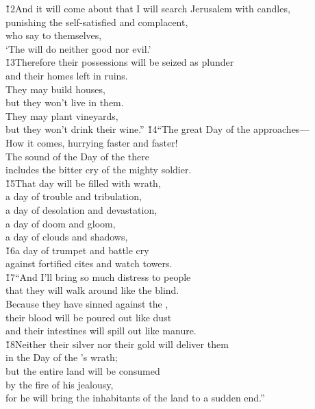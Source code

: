\begin{poetry}
\poeml \v{12}And it will come about that I will search Jerusalem with candles, \\
\poemll    punishing the self-satisfied and complacent, \\
\poeml who say to themselves, \\
\poemll    `The  will do neither good nor evil.' \\
\poeml \v{13}Therefore their possessions will be seized as plunder \\
\poemll    and their homes left in ruins. \\
\poeml They may build houses, \\
\poemll    but they won't live in them. \\
\poeml They may plant vineyards, \\
\poemll    but they won't drink their wine.''
\poeml \v{14}``The great Day of the  approaches--- \\
\poemll    How it comes, hurrying faster and faster! \\
\poeml The sound of the Day of the  there \\
\poemll    includes the bitter cry of the mighty soldier. \\
\poeml \v{15}That day will be filled with wrath, \\
\poemll    a day of trouble and tribulation, \\
\poeml a day of desolation and devastation, \\
\poemll    a day of doom and gloom, \\
\poeml a day of clouds and shadows, \\
\poeml \v{16}a day of trumpet and battle cry \\
\poemlll       against fortified cites and watch towers. \\
\poeml \v{17}``And I'll bring so much distress to people \\
\poemll    that they will walk around like the blind. \\
\poeml Because they have sinned against the , \\
\poemll    their blood will be poured out like dust \\
\poemlll       and their intestines will spill out like manure. \\
\poeml \v{18}Neither their silver nor their gold will deliver them \\
\poemll    in the Day of the 's wrath; \\
\poeml but the entire land will be consumed \\
\poemll    by the fire of his jealousy, \\
\poeml for he will bring the inhabitants of the land to a sudden end.''
\end{poetry}

